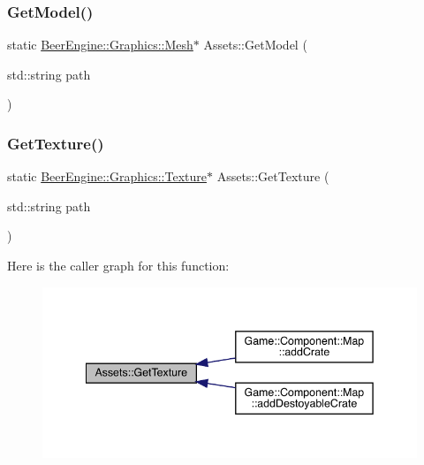 \mbox{\label{class_assets_a2fcfb2c8c5a0ca4630230f4086b010f6}} 
\subsubsection{\texorpdfstring{Get\+Model()}{GetModel()}}
{\footnotesize\ttfamily static \mbox{\hyperlink{class_beer_engine_1_1_graphics_1_1_mesh}{Beer\+Engine\+::\+Graphics\+::\+Mesh}}$\ast$ Assets\+::\+Get\+Model (\begin{DoxyParamCaption}\item[{std\+::string}]{path }\end{DoxyParamCaption})\hspace{0.3cm}{\ttfamily [static]}}

\mbox{\label{class_assets_a1dc713408638d18566ec35221a0ede24}} 
\subsubsection{\texorpdfstring{Get\+Texture()}{GetTexture()}}
{\footnotesize\ttfamily static \mbox{\hyperlink{class_beer_engine_1_1_graphics_1_1_texture}{Beer\+Engine\+::\+Graphics\+::\+Texture}}$\ast$ Assets\+::\+Get\+Texture (\begin{DoxyParamCaption}\item[{std\+::string}]{path }\end{DoxyParamCaption})\hspace{0.3cm}{\ttfamily [static]}}

Here is the caller graph for this function\+:\nopagebreak
\begin{figure}[H]
\begin{center}
\leavevmode
\includegraphics[width=342pt]{class_assets_a1dc713408638d18566ec35221a0ede24_icgraph}
\end{center}
\end{figure}
\mbox{\label{class_assets_a39f25e7a1853ac52ca5fcfdb676ace04}} 
